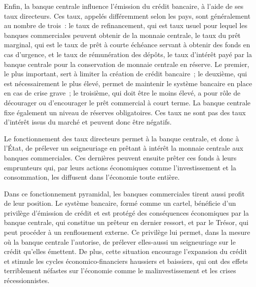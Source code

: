 Enfin, la banque centrale influence l'émission du crédit bancaire, à l'aide de ses taux directeurs. Ces taux, appelés différemment selon les pays, sont généralement au nombre de trois~: le taux de refinancement, qui est taux usuel pour lequel les banques commerciales peuvent obtenir de la monnaie centrale, le taux du prêt marginal, qui est le taux de prêt à courte échéance servant à obtenir des fonds en cas d'urgence, et le taux de rémunération des dépôts, le taux d'intérêt payé par la banque centrale pour la conservation de monnaie centrale en réserve. Le premier, le plus important, sert à limiter la création de crédit bancaire~; le deuxième, qui est nécessairement le plus élevé, permet de maintenir le système bancaire en place en cas de crise grave~; le troisième, qui doit être le moins élevé, a pour rôle de décourager ou d'encourager le prêt commercial à court terme. La banque centrale fixe également un niveau de réserves obligatoires. Ces taux ne sont pas des taux d'intérêt issus du marché et peuvent donc être négatifs.


Le fonctionnement des taux directeurs permet à la banque centrale, et donc à l'État, de prélever un seigneuriage en prêtant à intérêt la monnaie centrale aux banques commerciales. Ces dernières peuvent ensuite prêter ces fonds à leurs emprunteurs qui, par leurs actions économiques comme l'investissement et la consommation, les diffusent dans l'économie toute entière.

Dans ce fonctionnement pyramidal, les banques commerciales tirent aussi profit de leur position. Le système bancaire, formé comme un cartel, bénéficie d'un privilège d'émission de crédit et est protégé des conséquences économiques par la banque centrale, qui constitue un prêteur en dernier ressort, et par le Trésor, qui peut procéder à un renflouement externe. Ce privilège lui permet, dans la mesure où la banque centrale l'autorise, de prélever elles-aussi un seigneuriage sur le crédit qu'elles émettent. De plus, cette situation encourage l'expansion du crédit et stimule les cycles économico-financiers haussiers et baissiers, qui ont des effets terriblement néfastes sur l'économie comme le malinvestissement et les crises récessionnistes.

